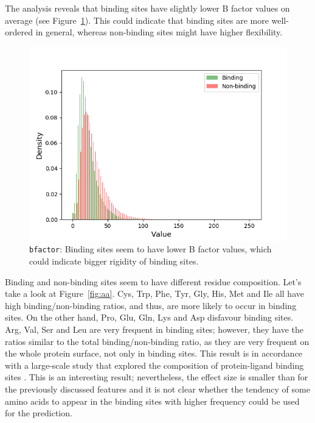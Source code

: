 The analysis reveals that binding sites have slightly lower B factor values on average (see Figure~\ref{fig:bfactor}). This could indicate that binding sites are more well-ordered in general, whereas non-binding sites might have higher flexibility.

\begin{figure}[]
\centering
\includegraphics[width=0.7\linewidth]{../img/bfactor_hist.png}
\caption{\texttt{bfactor}: Binding sites seem to have lower B factor values, which could indicate bigger rigidity of binding sites.}
\label{fig:bfactor}
\end{figure}

Binding and non-binding sites seem to have different residue composition. Let's take a look at Figure~\ref{fig:aa}. Cys, Trp, Phe, Tyr, Gly, His, Met and Ile all have high binding/non-binding ratios, and thus, are more likely to occur in binding sites. On the other hand, Pro, Glu, Gln, Lys and Asp disfavour binding sites. Arg, Val, Ser and Leu are very frequent in binding sites; however, they have the ratios similar to the total binding/non-binding ratio, as they are very frequent on the whole protein surface, not only in binding sites. This result is in accordance with a large-scale study that explored the composition of protein-ligand binding sites \cite{lbscomposition}. This is an interesting result; nevertheless, the effect size is smaller than for the previously discussed features and it is not clear whether the tendency of some amino acids to appear in the binding sites with higher frequency could be used for the prediction.

